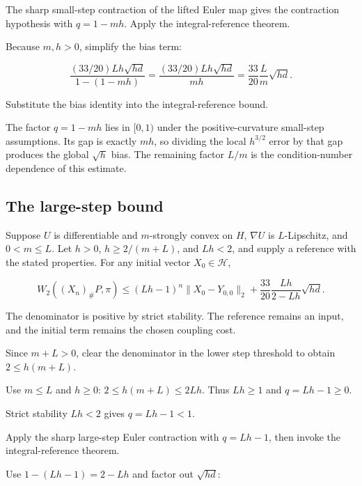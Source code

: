 \documentclass[11pt,a4paper]{report}
\begin{document}
The sharp small-step contraction of the lifted Euler map gives the contraction hypothesis with \(q=1-mh\). Apply the integral-reference theorem.



Because \(m,h>0\), simplify the bias term:

\[\frac{(33/20)Lh\sqrt{hd}}{1-(1-mh)}=\frac{(33/20)Lh\sqrt{hd}}{mh}=\frac{33}{20}\frac Lm\sqrt{hd}.\]

Substitute the bias identity into the integral-reference bound.



The factor \(q=1-mh\) lies in \([0,1)\) under the positive-curvature small-step assumptions. Its gap is exactly \(mh\), so dividing the local \(h^{3/2}\) error by that gap produces the global \(\sqrt h\) bias. The remaining factor \(L/m\) is the condition-number dependence of this estimate.

\subsection{\texorpdfstring{The large-step bound}{The large-step bound}}
\label{report-step-UnadjustedLangevin-HilbertDalalyan-lean-6}


Suppose \(U\) is differentiable and \(m\)-strongly convex on \(H\), \(\nabla U\) is \(L\)-Lipschitz, and \(0<m\le L\). Let \(h>0\), \(h\ge2/(m+L)\), and \(Lh<2\), and supply a reference with the stated properties. For any initial vector \(X_0\in\mathcal H\),

\[W_2((X_n)_\#P,\pi)\le(Lh-1)^n\|X_0-Y_{0,0}\|_2+\frac{33}{20}\frac{Lh}{2-Lh}\sqrt{hd}.\]

The denominator is positive by strict stability. The reference remains an input, and the initial term remains the chosen coupling cost.



Since \(m+L>0\), clear the denominator in the lower step threshold to obtain \(2\le h(m+L)\).



Use \(m\le L\) and \(h\ge0\): \(2\le h(m+L)\le2Lh\). Thus \(Lh\ge1\) and \(q=Lh-1\ge0\).



Strict stability \(Lh<2\) gives \(q=Lh-1<1\).



Apply the sharp large-step Euler contraction with \(q=Lh-1\), then invoke the integral-reference theorem.



Use \(1-(Lh-1)=2-Lh\) and factor out \(\sqrt{hd}\):
\end{document}
